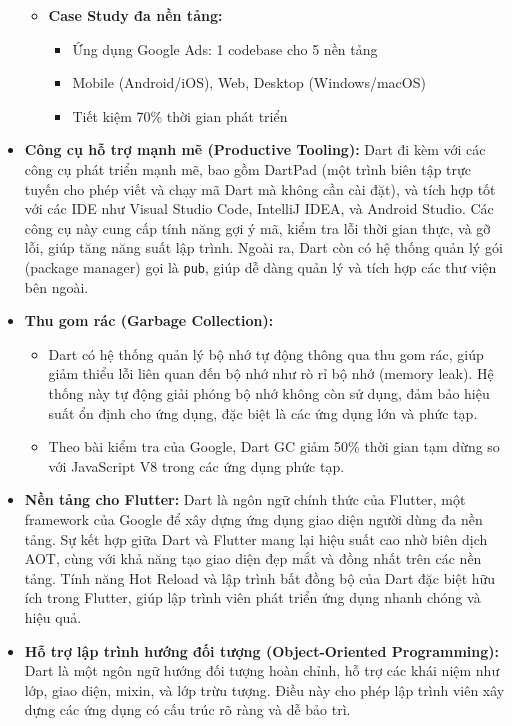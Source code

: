 \documentclass[../DoAn.tex]{subfiles}
\numberwithin{figure}{chapter}
\begin{document}
\begin{itemize}
\begin{itemize}
    \item \textbf{Case Study đa nền tảng:}
    \begin{itemize}
        \item Ứng dụng Google Ads: 1 codebase cho 5 nền tảng
        \item Mobile (Android/iOS), Web, Desktop (Windows/macOS)
        \item Tiết kiệm 70\% thời gian phát triển
    \end{itemize}
\end{itemize}

    \item \textbf{Công cụ hỗ trợ mạnh mẽ (Productive Tooling):} 
    Dart đi kèm với các công cụ phát triển mạnh mẽ, bao gồm DartPad (một trình biên tập trực tuyến cho phép viết và chạy mã Dart mà không cần cài đặt), và tích hợp tốt với các IDE như Visual Studio Code, IntelliJ IDEA, và Android Studio. Các công cụ này cung cấp tính năng gợi ý mã, kiểm tra lỗi thời gian thực, và gỡ lỗi, giúp tăng năng suất lập trình. Ngoài ra, Dart còn có hệ thống quản lý gói (package manager) gọi là \texttt{pub}, giúp dễ dàng quản lý và tích hợp các thư viện bên ngoài.

    \item \textbf{Thu gom rác (Garbage Collection):} 
    \begin{itemize}
        \item Dart có hệ thống quản lý bộ nhớ tự động thông qua thu gom rác, giúp giảm thiểu lỗi liên quan đến bộ nhớ như rò rỉ bộ nhớ (memory leak). Hệ thống này tự động giải phóng bộ nhớ không còn sử dụng, đảm bảo hiệu suất ổn định cho ứng dụng, đặc biệt là các ứng dụng lớn và phức tạp.
        \item Theo bài kiểm tra của Google, Dart GC giảm 50\% thời gian tạm dừng so với JavaScript V8 trong các ứng dụng phức tạp.
    \end{itemize}

    \item \textbf{Nền tảng cho Flutter:} 
    Dart là ngôn ngữ chính thức của Flutter, một framework của Google để xây dựng ứng dụng giao diện người dùng đa nền tảng. Sự kết hợp giữa Dart và Flutter mang lại hiệu suất cao nhờ biên dịch AOT, cùng với khả năng tạo giao diện đẹp mắt và đồng nhất trên các nền tảng. Tính năng Hot Reload và lập trình bất đồng bộ của Dart đặc biệt hữu ích trong Flutter, giúp lập trình viên phát triển ứng dụng nhanh chóng và hiệu quả.

    \item \textbf{Hỗ trợ lập trình hướng đối tượng (Object-Oriented Programming):} 
    Dart là một ngôn ngữ hướng đối tượng hoàn chỉnh, hỗ trợ các khái niệm như lớp, giao diện, mixin, và lớp trừu tượng. Điều này cho phép lập trình viên xây dựng các ứng dụng có cấu trúc rõ ràng và dễ bảo trì.
\end{itemize}
\end{document}
